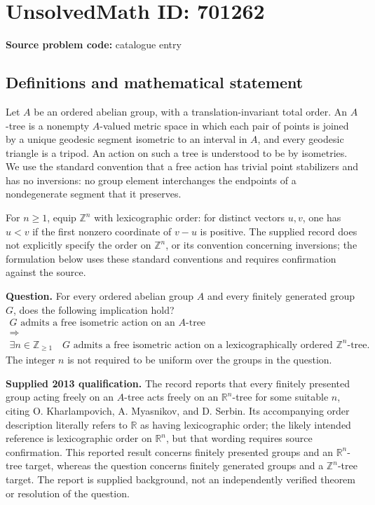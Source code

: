 \documentclass[11pt]{article}
\newcommand{\Z}{\mathbb{Z}}
\newcommand{\R}{\mathbb{R}}
\begin{document}
\section*{UnsolvedMath ID: 701262}
\textbf{Source problem code:} catalogue entry
\subsection{Definitions and mathematical statement}
Let \(A\) be an ordered abelian group, with a translation-invariant total order. An \(A\)-tree is a nonempty \(A\)-valued metric space in which each pair of points is joined by a unique geodesic segment isometric to an interval in \(A\), and every geodesic triangle is a tripod. An action on such a tree is understood to be by isometries. We use the standard convention that a free action has trivial point stabilizers and has no inversions: no group element interchanges the endpoints of a nondegenerate segment that it preserves.

For \(n\geq 1\), equip \(\Z^n\) with lexicographic order: for distinct vectors \(u,v\), one has \(u<v\) if the first nonzero coordinate of \(v-u\) is positive. The supplied record does not explicitly specify the order on \(\Z^n\), or its convention concerning inversions; the formulation below uses these standard conventions and requires confirmation against the source.

\textbf{Question.} For every ordered abelian group \(A\) and every finitely generated group \(G\), does the following implication hold?
\[
\begin{gathered}
G\text{ admits a free isometric action on an }A\text{-tree}
\\[2pt]
\Longrightarrow
\\[2pt]
\exists n\in\Z_{\geq 1}\quad
G\text{ admits a free isometric action on a lexicographically ordered }\Z^n\text{-tree}.
\end{gathered}
\]
The integer \(n\) is not required to be uniform over the groups in the question.

\textbf{Supplied 2013 qualification.} The record reports that every finitely presented group acting freely on an \(A\)-tree acts freely on an \(\R^n\)-tree for some suitable \(n\), citing O. Kharlampovich, A. Myasnikov, and D. Serbin. Its accompanying order description literally refers to \(\R\) as having lexicographic order; the likely intended reference is lexicographic order on \(\R^n\), but that wording requires source confirmation. This reported result concerns finitely presented groups and an \(\R^n\)-tree target, whereas the question concerns finitely generated groups and a \(\Z^n\)-tree target. The report is supplied background, not an independently verified theorem or resolution of the question.
\end{document}
